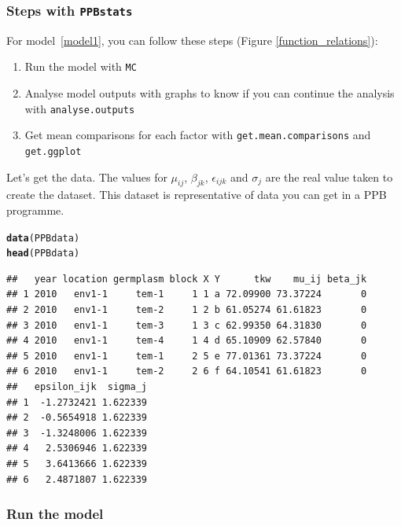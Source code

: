 \documentclass{article}\usepackage[]{graphicx}\usepackage[]{color}
\makeatletter
\newcommand{\hlstd}[1]{\textcolor[rgb]{0.345,0.345,0.345}{#1}}%
\newcommand{\hlkwd}[1]{\textcolor[rgb]{0.737,0.353,0.396}{\textbf{#1}}}%
\newenvironment{kframe}{%
 \def\at@end@of@kframe{}%
 \ifinner\ifhmode%
  \def\at@end@of@kframe{\end{minipage}}%
  \begin{minipage}{\columnwidth}%
 \fi\fi%
 \def\FrameCommand##1{\hskip\@totalleftmargin \hskip-\fboxsep
 \colorbox{shadecolor}{##1}\hskip-\fboxsep
     \hskip-\linewidth \hskip-\@totalleftmargin \hskip\columnwidth}%
 \MakeFramed {\advance\hsize-\width
   \@totalleftmargin\z@ \linewidth\hsize
   \@setminipage}}%
 {\par\unskip\endMakeFramed%
 \at@end@of@kframe}
\newenvironment{knitrout}{}{} %
\newcommand{\pack}{\texttt{PPBstats}}
\makeatother
\begin{document}
\subsubsection{Steps with \pack}

For model~\ref{model1}, you can follow these steps (Figure \ref{function_relations}):

\begin{enumerate}
\item Run the model with \texttt{MC}
\item Analyse model outputs with graphs to know if you can continue the analysis with \texttt{analyse.outputs}
\item Get mean comparisons for each factor with \texttt{get.mean.comparisons} and \texttt{get.ggplot}
\end{enumerate}

Let's get the data.
The values for $\mu_{ij}$, $\beta_{jk}$, $\epsilon_{ijk}$ and $\sigma_j$ are the real value taken to create the dataset.
This dataset is representative of data you can get in a PPB programme.

\begin{knitrout}
\color{fgcolor}\begin{kframe}
\begin{alltt}
\hlkwd{data}\hlstd{(PPBdata)}
\hlkwd{head}\hlstd{(PPBdata)}
\end{alltt}
\begin{verbatim}
##   year location germplasm block X Y      tkw    mu_ij beta_jk
## 1 2010   env1-1     tem-1     1 1 a 72.09900 73.37224       0
## 2 2010   env1-1     tem-2     1 2 b 61.05274 61.61823       0
## 3 2010   env1-1     tem-3     1 3 c 62.99350 64.31830       0
## 4 2010   env1-1     tem-4     1 4 d 65.10909 62.57840       0
## 5 2010   env1-1     tem-1     2 5 e 77.01361 73.37224       0
## 6 2010   env1-1     tem-2     2 6 f 64.10541 61.61823       0
##   epsilon_ijk  sigma_j
## 1  -1.2732421 1.622339
## 2  -0.5654918 1.622339
## 3  -1.3248006 1.622339
## 4   2.5306946 1.622339
## 5   3.6413666 1.622339
## 6   2.4871807 1.622339
\end{verbatim}
\end{kframe}
\end{knitrout}

\subsubsection{Run the model}
\end{document}

